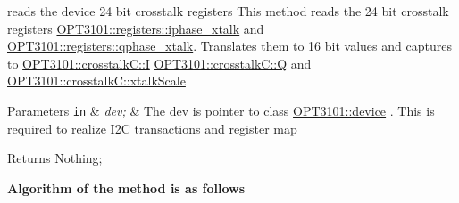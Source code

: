 reads the device 24 bit crosstalk registers This method reads the 24 bit crosstalk registers \mbox{\hyperlink{class_o_p_t3101_1_1registers_ae87864da6c35bed7c34ebf5f26ba4513}{O\+P\+T3101\+::registers\+::iphase\+\_\+xtalk}} and \mbox{\hyperlink{class_o_p_t3101_1_1registers_ad94d98dfb26313a9d32c5c2c0c673693}{O\+P\+T3101\+::registers\+::qphase\+\_\+xtalk}}. Translates them to 16 bit values and captures to \mbox{\hyperlink{class_o_p_t3101_1_1crosstalk_c_a97152b209288a0dc30c4158fdc1815fc}{O\+P\+T3101\+::crosstalk\+C\+::I}} \mbox{\hyperlink{class_o_p_t3101_1_1crosstalk_c_a1e20d913baf2432ec90fe06a45c226db}{O\+P\+T3101\+::crosstalk\+C\+::Q}} and \mbox{\hyperlink{class_o_p_t3101_1_1crosstalk_c_a5a5c560e1f5db427c02863a9618d9fa4}{O\+P\+T3101\+::crosstalk\+C\+::xtalk\+Scale}} 


\begin{DoxyParams}[1]{Parameters}
\mbox{\tt in}  & {\em dev;} & The dev is pointer to class \mbox{\hyperlink{class_o_p_t3101_1_1device}{O\+P\+T3101\+::device}} . This is required to realize I2C transactions and register map \\
\hline
\end{DoxyParams}
\begin{DoxyReturn}{Returns}
Nothing; 
\end{DoxyReturn}
{\bfseries Algorithm of the method is as follows}


